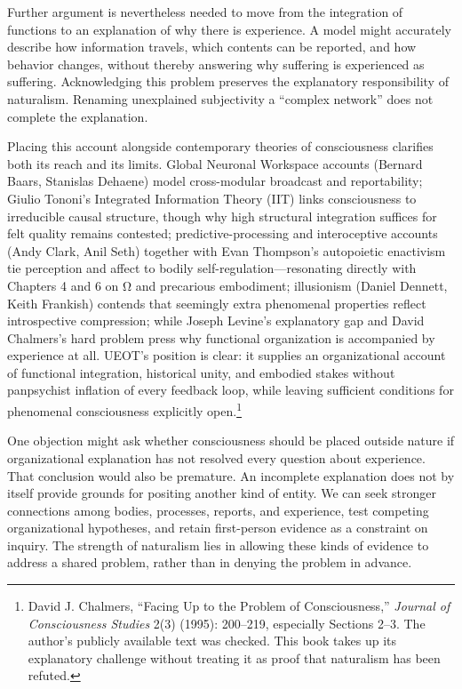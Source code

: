 \documentclass[
  english,
  11pt,
  oneside]{book}
\begin{document}
Further argument is nevertheless needed to move from the integration of functions to an explanation of why there is experience. A model might accurately describe how information travels, which contents can be reported, and how behavior changes, without thereby answering why suffering is experienced as suffering. Acknowledging this problem preserves the explanatory responsibility of naturalism. Renaming unexplained subjectivity a ``complex network'' does not complete the explanation.

Placing this account alongside contemporary theories of consciousness clarifies both its reach and its limits. Global Neuronal Workspace accounts (Bernard Baars, Stanislas Dehaene) model cross-modular broadcast and reportability; Giulio Tononi's Integrated Information Theory (IIT) links consciousness to irreducible causal structure, though why high structural integration suffices for felt quality remains contested; predictive-processing and interoceptive accounts (Andy Clark, Anil Seth) together with Evan Thompson's autopoietic enactivism tie perception and affect to bodily self-regulation---resonating directly with Chapters 4 and 6 on Ω and precarious embodiment; illusionism (Daniel Dennett, Keith Frankish) contends that seemingly extra phenomenal properties reflect introspective compression; while Joseph Levine's explanatory gap and David Chalmers's hard problem press why functional organization is accompanied by experience at all. UEOT's position is clear: it supplies an organizational account of functional integration, historical unity, and embodied stakes without panpsychist inflation of every feedback loop, while leaving sufficient conditions for phenomenal consciousness explicitly open.\footnote{\hypertarget{ph-note-52}{}David J. Chalmers, ``Facing Up to the Problem of Consciousness,'' \emph{Journal of Consciousness Studies} 2(3) (1995): 200--219, especially Sections 2--3. The author's publicly available text was checked. This book takes up its explanatory challenge without treating it as proof that naturalism has been refuted.}

One objection might ask whether consciousness should be placed outside nature if organizational explanation has not resolved every question about experience. That conclusion would also be premature. An incomplete explanation does not by itself provide grounds for positing another kind of entity. We can seek stronger connections among bodies, processes, reports, and experience, test competing organizational hypotheses, and retain first-person evidence as a constraint on inquiry. The strength of naturalism lies in allowing these kinds of evidence to address a shared problem, rather than in denying the problem in advance.
\end{document}
